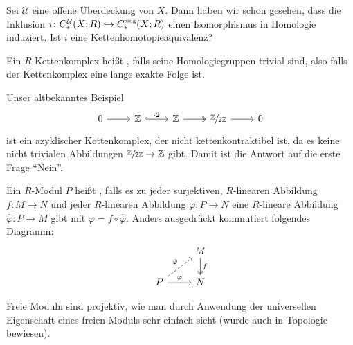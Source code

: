 \begin{frage}
	Sei $\mathcal{U}$ eine offene Überdeckung von $X$. 
	Dann haben wir schon gesehen, dass die Inklusion $i \colon C_*^\mathcal{U}(X;R) \hookrightarrow C_*^\sing(X;R)$ einen Isomorphismus in Homologie induziert. 
	Ist $i$ eine Kettenhomotopieäquivalenz?
\end{frage}

\begin{definition}[{name=[azyklischer Kettenkomplex]}]
	Ein $R$-Kettenkomplex heißt , falls seine Homologiegruppen trivial sind, also falls der Kettenkomplex eine lange exakte Folge ist.
\end{definition}

\begin{beispiel}[{name=[Beispiel eines azyklischen Kettenkomplex]}]
	Unser altbekanntes Beispiel
	\[
		\begin{tikzcd}
			0 \rar & \mathbb{Z} \rar["\cdot 2",hook] & \mathbb{Z} \rar[two heads] & \sfrac{\mathbb{Z}}{2 \mathbb{Z}} \rar & 0
		\end{tikzcd}
	\]
	ist ein azyklischer Kettenkomplex, der nicht kettenkontraktibel ist, da es keine nicht trivialen Abbildungen $\sfrac{\mathbb{Z}}{2 \mathbb{Z}} \to \mathbb{Z}$ gibt. Damit ist 
	die Antwort auf die erste Frage \enquote{Nein}.
\end{beispiel}

\begin{definition}[{name=[projektiver Modul]},label=def_projektiv]
	Ein $R$-Modul $P$ heißt , falls es zu jeder surjektiven, $R$-linearen Abbildung $f \colon M \to N$ und jeder $R$-linearen Abbildung
	$\varphi \colon P \to N$ eine $R$-lineare Abbildung $\hat{\varphi} \colon P \to M$ gibt mit $\varphi= f \circ \hat{\varphi}$. Anders ausgedrückt kommutiert folgendes Diagramm:
	\[
		\begin{tikzcd}
			\mbox{ } & M \dar[two heads,"f"] \\
			P \rar["\varphi"] \urar["\hat{\varphi}",dashed] & N
		\end{tikzcd}
	\]
\end{definition}

\begin{beispiel}[{name=[Freie Moduln sind projektiv]}]
	Freie Moduln sind projektiv, wie man durch Anwendung der universellen Eigenschaft eines freien Moduls sehr einfach sieht (wurde auch in Topologie  bewiesen). 
\end{beispiel}

